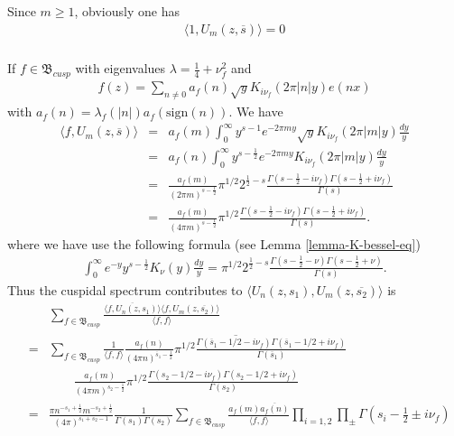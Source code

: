 \documentclass[11pt,reqno]{amsart}
\newcommand{\bea}{\begin{eqnarray}}
\newcommand{\eea}{\end{eqnarray}}
\newcommand{\bna}{\begin{eqnarray*}}
\newcommand{\ena}{\end{eqnarray*}}
\theoremstyle{definition}
\begin{document}
\subsubsection{}
Since $m\geq 1$, obviously one has
\bea
\langle 1, U_m(z,\overline s)\rangle =0
\label{Poincare-inner-wt-residue}
\eea

\subsubsection{}
If  $f\in \mathfrak B_{cusp}$ with eigenvalues $\lambda=\frac{1}{4}+\nu_f^2$ and
\bna
f(z)=\sum_{n\neq 0}a_f(n)\sqrt{y} K_{i\nu_f}(2\pi |n|y) e(nx)
\ena
with  $a_f(n)=\lambda_f(|n|)a_f(\mbox{sign}(n))$.
We have
\bea
\nonumber\langle f, U_m(z,\overline s)\rangle
&=&a_f(m)\int_0^\infty y^{s-1}e^{-2\pi my}\sqrt{y}K_{i\nu_f}(2\pi |m| y)\frac{dy}{y}\\
\nonumber&=&a_f(n)\int_0^\infty y^{s-\frac{1}{2}}e^{-2\pi my}K_{i\nu_f}(2\pi |m| y)\frac{dy}{y}\\
&=&\frac{a_f(m)}{(2\pi m)^{s-\frac{1}{2}}}
\pi^{1/2}2^{\frac{1}{2}-s}\frac{\Gamma(s-\frac{1}{2}-i\nu_f)
\Gamma(s-\frac{1}{2}+i\nu_f)}{\Gamma(s)}\nonumber\\
&=&\frac{a_f(m)}{(4\pi m)^{s-\frac{1}{2}}}
\pi^{1/2}\frac{\Gamma(s-\frac{1}{2}-i\nu_f)
\Gamma(s-\frac{1}{2}+i\nu_f)}{\Gamma(s)}.
\label{Poincare-inner-wt-cusp}
\eea
where we have use the following formula  (see Lemma \ref{lemma-K-bessel-eq})
\bea
\int_0^\infty  e^{-y}y^{s-\frac{1}{2}}K_{\nu}(y)\frac{dy}{y}
=\pi^{1/2}2^{\frac{1}{2}-s}\frac{\Gamma(s-\frac{1}{2}-\nu)\Gamma(s-\frac{1}{2}+\nu)}{\Gamma(s)}
\label{K-bessel-integral-eq}.
\eea
Thus the cuspidal spectrum contributes to  $\langle U_n(z,s_1),U_m(z,\overline{s_2})
\rangle $ is
\bna
&&\sum_{f\in\mathfrak B_{cusp}}
\frac{
\overline{\langle f, U_n(z,s_1)\rangle}
\langle f,U_m(z,\overline {s_2})\rangle}
{\langle f,f\rangle}\\
&=&\sum_{f\in\mathfrak B_{cusp}}
\frac{1}{\langle f,f\rangle}
\overline{
\frac{a_f(n)}{(4\pi n)^{\overline s_1-\frac{1}{2}}}\pi^{1/2}
\frac{\Gamma(\overline s_1-1/2-i\nu_f)
\Gamma(\overline s_1-1/2+i\nu_f)
}{\Gamma(\overline s_1)}
}\\
&&\qquad
\frac{a_f(m)}{(4\pi m)^{ s_2-\frac{1}{2}}}\pi^{1/2}
\frac{\Gamma(s_2-1/2-i\nu_f)
\Gamma( s_2-1/2+i\nu_f)
}{\Gamma(s_2)}\\
&=&\frac{\pi n^{-s_1+\frac{1}{2}}m^{-s_2+\frac{1}{2}}
}{(4\pi)^{s_1+s_2-1}}
\frac{1}{\Gamma(s_1)\Gamma(s_2)}
\sum_{f\in\mathfrak B_{cusp}}\frac{a_f(m)\overline{a_f(n)}}{\langle f,f\rangle}
\prod_{i=1,2}\prod_{\pm}\Gamma(s_i-\frac{1}{2}\pm i\nu_f)
\ena
\end{document}
